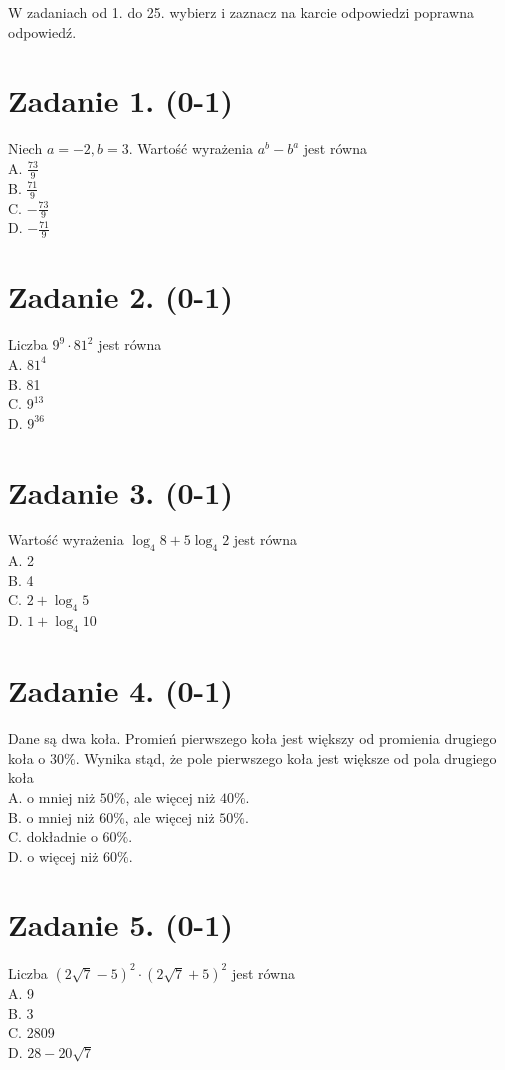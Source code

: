 \documentclass[10pt]{article}
\begin{document}
W zadaniach od 1. do 25. wybierz i zaznacz na karcie odpowiedzi poprawna odpowiedź.

\section*{Zadanie 1. (0-1)}
Niech \(a=-2, b=3\). Wartość wyrażenia \(a^{b}-b^{a}\) jest równa\\
A. \(\frac{73}{9}\)\\
B. \(\frac{71}{9}\)\\
C. \(-\frac{73}{9}\)\\
D. \(-\frac{71}{9}\)

\section*{Zadanie 2. (0-1)}
Liczba \(9^{9} \cdot 81^{2}\) jest równa\\
A. \(81^{4}\)\\
B. 81\\
C. \(9^{13}\)\\
D. \(9^{36}\)

\section*{Zadanie 3. (0-1)}
Wartość wyrażenia \(\log _{4} 8+5 \log _{4} 2\) jest równa\\
A. 2\\
B. 4\\
C. \(2+\log _{4} 5\)\\
D. \(1+\log _{4} 10\)

\section*{Zadanie 4. (0-1)}
Dane są dwa koła. Promień pierwszego koła jest większy od promienia drugiego koła o \(30 \%\). Wynika stąd, że pole pierwszego koła jest większe od pola drugiego koła\\
A. o mniej niż \(50 \%\), ale więcej niż \(40 \%\).\\
B. o mniej niż \(60 \%\), ale więcej niż \(50 \%\).\\
C. dokładnie o \(60 \%\).\\
D. o więcej niż \(60 \%\).

\section*{Zadanie 5. (0-1)}
Liczba \((2 \sqrt{7}-5)^{2} \cdot(2 \sqrt{7}+5)^{2}\) jest równa\\
A. 9\\
B. 3\\
C. 2809\\
D. \(28-20 \sqrt{7}\)
\end{document}
